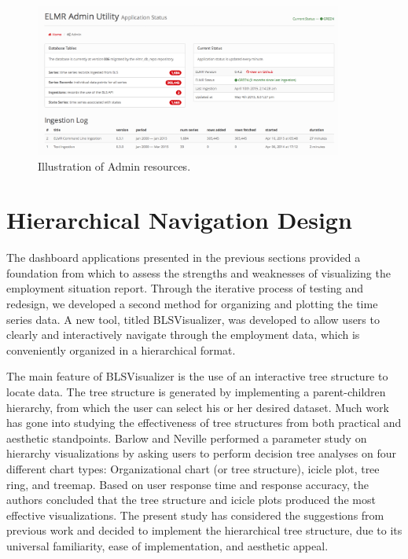 \documentclass[11pt,letterpaper]{article}
\begin{document}
\begin{figure}[h]
    \centering
    \includegraphics[width=0.9\textwidth]{figures/Admin.png}
    \caption{Illustration of Admin resources.}
    \label{fig:admin}
\end{figure}


\section{Hierarchical Navigation Design}

The dashboard applications presented in the previous sections provided a foundation from which to assess the strengths and weaknesses of visualizing the employment situation report. Through the iterative process of testing and redesign, we developed a second method for organizing and plotting the time series data.  A new tool, titled BLSVisualizer, was developed to allow users to clearly and interactively navigate through the employment data, which is conveniently organized in a hierarchical format.

The main feature of BLSVisualizer is the use of an interactive tree structure to locate data. The tree structure is generated by implementing a parent-children hierarchy, from which the user can select his or her desired dataset. Much work has gone into studying the effectiveness of tree structures from both practical \cite{barlow2001comparison, plaisant2002spacetree} and aesthetic \cite{wetherell1979tidy, reingold1981tidier} standpoints. Barlow and Neville performed a parameter study on hierarchy visualizations by asking users to perform decision tree analyses on four different chart types: Organizational chart (or tree structure), icicle plot, tree ring, and treemap. Based on user response time and response accuracy, the authors concluded that the tree structure and icicle plots produced the most effective visualizations. The present study has considered the suggestions from previous work and decided to implement the hierarchical tree structure, due to its universal familiarity, ease of implementation, and aesthetic appeal.
\end{document}
